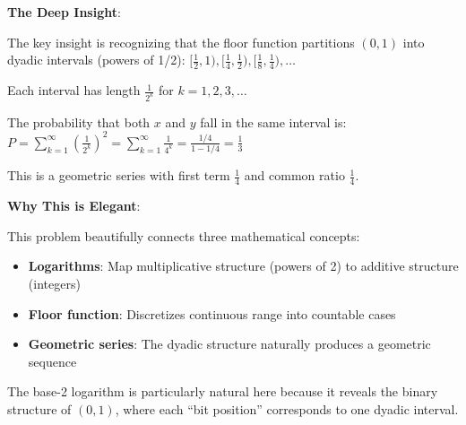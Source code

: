 \documentclass[11pt]{article}
\begin{document}
\begin{keyinsightbox}
\textbf{The Deep Insight}:

The key insight is recognizing that the floor function partitions $(0,1)$ into dyadic intervals (powers of 1/2):
$[\frac{1}{2}, 1), [\frac{1}{4}, \frac{1}{2}), [\frac{1}{8}, \frac{1}{4}), \ldots$

Each interval has length $\frac{1}{2^k}$ for $k = 1, 2, 3, \ldots$

The probability that both $x$ and $y$ fall in the same interval is:
$P = \sum_{k=1}^{\infty} \left(\frac{1}{2^k}\right)^2 = \sum_{k=1}^{\infty} \frac{1}{4^k} = \frac{1/4}{1-1/4} = \frac{1}{3}$

This is a geometric series with first term $\frac{1}{4}$ and common ratio $\frac{1}{4}$.

\textbf{Why This is Elegant}:

This problem beautifully connects three mathematical concepts:
\begin{itemize}
    \item \textbf{Logarithms}: Map multiplicative structure (powers of 2) to additive structure (integers)
    \item \textbf{Floor function}: Discretizes continuous range into countable cases
    \item \textbf{Geometric series}: The dyadic structure naturally produces a geometric sequence
\end{itemize}

The base-2 logarithm is particularly natural here because it reveals the binary structure of $(0,1)$, where each ``bit position'' corresponds to one dyadic interval.
\end{keyinsightbox}
\end{document}
